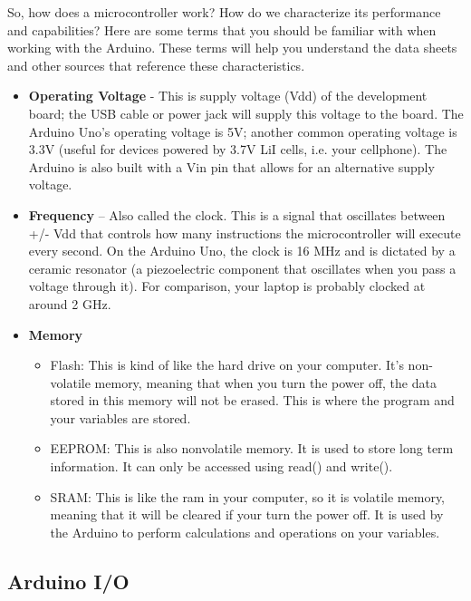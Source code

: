 \documentclass[10pt]{report}
\begin{document}
So, how does a microcontroller work? How do we characterize its performance and capabilities? Here are some terms that you should be familiar with when working with the Arduino. These terms will help you understand the data sheets and other sources that reference these characteristics.

 \begin{itemize}
\item \textbf{Operating Voltage} - This is supply voltage (Vdd) of the development board; the USB cable or power jack will supply this voltage to the board. The Arduino Uno’s operating voltage is 5V; another common operating voltage is 3.3V (useful for devices powered by 3.7V LiI cells, i.e. your cellphone). The Arduino is also built with a Vin pin that allows for an alternative supply voltage.
  
\item \textbf{Frequency} – Also called the clock. This is a signal that oscillates between +/- Vdd that controls how many instructions the microcontroller will execute every second. On the Arduino Uno, the clock is 16 MHz and is dictated by a ceramic resonator (a piezoelectric component that oscillates when you pass a voltage through it). For comparison, your laptop is probably clocked at around 2 GHz.

\item \textbf{Memory}
\begin{itemize}

\item Flash: This is kind of like the hard drive on your computer. It’s non-volatile memory, meaning that when you turn the power off, the data stored in this memory will not be erased. This is where the program and your variables are stored.

\item EEPROM: This is also nonvolatile memory. It is used to store long term information. It can only be accessed using read() and write().

\item SRAM: This is like the ram in your computer, so it is volatile memory, meaning that it will be cleared if your turn the power off. It is used by the Arduino to perform calculations and operations on your variables.

\end{itemize}
\end{itemize}

\subsection*{Arduino I/O}
\end{document}
